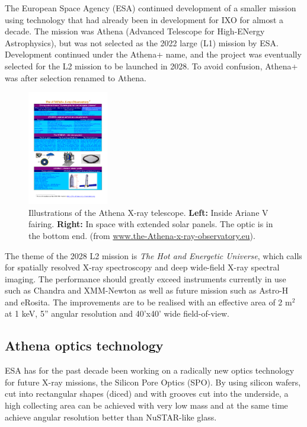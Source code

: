 The European Space Agency (ESA) continued development of a smaller mission using technology that had already been in development for IXO for almost a decade. The mission was Athena (Advanced Telescope for High-ENergy Astrophysics)\cite{Barcons:2012va}, but was not selected as the 2022 large (L1) mission by ESA. Development continued under the Athena+ name, and the project was eventually selected for the L2 mission to be launched in 2028. To avoid confusion, Athena+ was after selection renamed to Athena.

\begin{figure}[!h]
  \center
  \includegraphics[height=5cm]{figures/athena/athena_telescope.pdf}
\caption{\footnotesize Illustrations of the Athena X-ray telescope. \textbf{Left:} Inside Ariane V fairing. \textbf{Right:} In space with extended solar panels. The optic is in the bottom end. (from \url{www.the-Athena-x-ray-observatory.eu}).}\label{fig:Athena_telescope}
\end{figure}

The theme of the 2028 L2 mission is \emph{The Hot and Energetic Universe}, which calls for spatially resolved X-ray spectroscopy and deep wide-field X-ray spectral imaging. The performance should greatly exceed instruments currently in use such as Chandra and XMM-Newton as well as future mission such as Astro-H and eRosita. The improvements are to be realised with an effective area of 2 m$^2$ at 1 keV, 5'' angular resolution and 40'x40' wide field-of-view\cite{Willingale:2013vo}.

\subsection{Athena optics technology}\label{sec:Athena_opt_tech}
ESA has for the past decade been working on a radically new optics technology for future X-ray missions, the Silicon Pore Optics (SPO)\cite{Barcons:2012va,Collon:2010bp,Collon:2006ky,Collon:2010bp,Collon:2006ky,Beijersbergen:2004cc}. By using silicon wafers, cut into rectangular shapes (diced) and with grooves cut into the underside, a high collecting area can be achieved with very low mass and at the same time achieve angular resolution better than NuSTAR-like glass.

